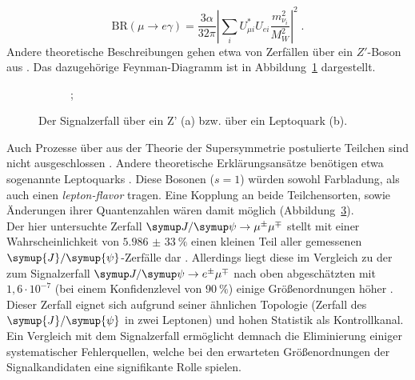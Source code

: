 %
\begin{equation}
  \label{eq:BRmuega}
  \text{BR}(\mu\rightarrow e\gamma)=\frac{3\alpha}{32\pi}\left|\sum_i U_{\mu i}^*U_{ei}\frac{m^2_{\nu_i}}{M^2_W}\right|^2\; .
\end{equation}
%
Andere theoretische Beschreibungen gehen etwa von Zerfällen über ein $Z'$-Boson aus \cite{zprime}. Das dazugehörige Feynman-Diagramm ist in Abbildung~\ref{fig:Zprime} dargestellt.
%
\begin{figure}
  \begin{subfigure}{0.48\textwidth}
    \centering
    ;
    \caption{}
    \label{fig:Zprime}
  \end{subfigure}
  \begin{subfigure}{0.48\textwidth}
    \centering
      \caption{}
      \label{fig:lepto}
  \end{subfigure}
  \caption{Der Signalzerfall über ein Z' (a) bzw. über ein Leptoquark (b).}
\end{figure}
%
Auch Prozesse über aus der Theorie der Supersymmetrie postulierte Teilchen sind nicht ausgeschlossen \cite{susy_gut2}. Andere theoretische Erklärungsansätze benötigen etwa sogenannte Leptoquarks \cite{leptoq}. Diese Bosonen ($s=1$) würden sowohl Farbladung, als auch einen \textit{lepton-flavor} tragen. Eine Kopplung an beide Teilchensorten, sowie Änderungen ihrer Quantenzahlen wären damit möglich (Abbildung~\ref{fig:lepto}).\\
Der hier untersuchte Zerfall $\kontroll$ stellt mit einer Wahrscheinlichkeit von $\SI{5,986(33)}{\percent}$ einen kleinen Teil aller gemessenen $\symup{J}/\symup{\psi}$-Zerfälle dar \cite{pdg}. Allerdings liegt diese im Vergleich zu der zum Signalzerfall $\signal$ nach oben abgeschätzten mit $1,6\cdot 10^{-7}$ (bei einem Konfidenzlevel von $\SI{90}{\percent}$) einige Größenordnungen höher \cite{BESIII}. Dieser Zerfall eignet sich aufgrund seiner ähnlichen Topologie (Zerfall des $\symup{J}/\symup{\psi}$ in zwei Leptonen) und hohen Statistik als Kontrollkanal. Ein Vergleich mit dem Signalzerfall ermöglicht demnach die Eliminierung einiger systematischer Fehlerquellen, welche bei den erwarteten Größenordnungen der Signalkandidaten eine signifikante Rolle spielen.
